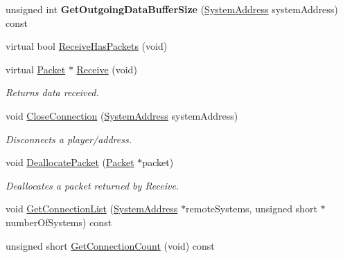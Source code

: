 \begin{DoxyCompactItemize}
\item 
\hypertarget{class_rak_net_1_1_t_c_p_interface_af1bce709eab2ff3dbf565f1c9a5a0e40}{unsigned int {\bfseries Get\-Outgoing\-Data\-Buffer\-Size} (\hyperlink{struct_rak_net_1_1_system_address}{System\-Address} system\-Address) const }\label{class_rak_net_1_1_t_c_p_interface_af1bce709eab2ff3dbf565f1c9a5a0e40}

\item 
virtual bool \hyperlink{class_rak_net_1_1_t_c_p_interface_adeff87b8a425edd704965cd5a04f8d3f}{Receive\-Has\-Packets} (void)
\item 
\hypertarget{class_rak_net_1_1_t_c_p_interface_a4b08b6bfdbf4523be67360e3042a4470}{virtual \hyperlink{struct_rak_net_1_1_packet}{Packet} $\ast$ \hyperlink{class_rak_net_1_1_t_c_p_interface_a4b08b6bfdbf4523be67360e3042a4470}{Receive} (void)}\label{class_rak_net_1_1_t_c_p_interface_a4b08b6bfdbf4523be67360e3042a4470}

\begin{DoxyCompactList}\small\item\em Returns data received. \end{DoxyCompactList}\item 
\hypertarget{class_rak_net_1_1_t_c_p_interface_aa0fcc53d22a035ca869cc16c92137e2b}{void \hyperlink{class_rak_net_1_1_t_c_p_interface_aa0fcc53d22a035ca869cc16c92137e2b}{Close\-Connection} (\hyperlink{struct_rak_net_1_1_system_address}{System\-Address} system\-Address)}\label{class_rak_net_1_1_t_c_p_interface_aa0fcc53d22a035ca869cc16c92137e2b}

\begin{DoxyCompactList}\small\item\em Disconnects a player/address. \end{DoxyCompactList}\item 
\hypertarget{class_rak_net_1_1_t_c_p_interface_ae142c6da699e6c5a925a49f45692eb2f}{void \hyperlink{class_rak_net_1_1_t_c_p_interface_ae142c6da699e6c5a925a49f45692eb2f}{Deallocate\-Packet} (\hyperlink{struct_rak_net_1_1_packet}{Packet} $\ast$packet)}\label{class_rak_net_1_1_t_c_p_interface_ae142c6da699e6c5a925a49f45692eb2f}

\begin{DoxyCompactList}\small\item\em Deallocates a packet returned by Receive. \end{DoxyCompactList}\item 
void \hyperlink{class_rak_net_1_1_t_c_p_interface_a1e12b180ca9339702395e97bbd4a9aff}{Get\-Connection\-List} (\hyperlink{struct_rak_net_1_1_system_address}{System\-Address} $\ast$remote\-Systems, unsigned short $\ast$number\-Of\-Systems) const 
\item 
\hypertarget{class_rak_net_1_1_t_c_p_interface_af90c9db62235a18a3e76fdc07d080915}{unsigned short \hyperlink{class_rak_net_1_1_t_c_p_interface_af90c9db62235a18a3e76fdc07d080915}{Get\-Connection\-Count} (void) const }\label{class_rak_net_1_1_t_c_p_interface_af90c9db62235a18a3e76fdc07d080915}


\end{DoxyCompactItemize}
